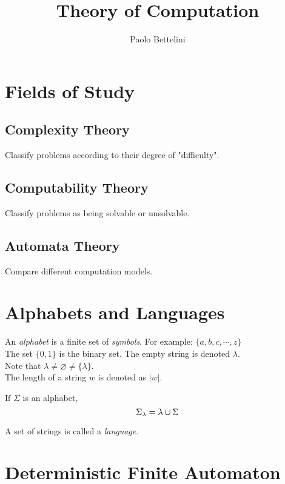 \documentclass{article}
\title{Theory of Computation}
\author{Paolo Bettelini}
\date{}
\newcommand{\emptyString}{\lambda}
\begin{document}
\maketitle
\tableofcontents
\pagebreak

\section{Fields of Study}

\subsection{Complexity Theory}

Classify problems according to their degree
of "difficulty".

\subsection{Computability Theory}

Classify problems as being solvable or unsolvable.

\subsection{Automata Theory}

Compare different computation models.

\section{Alphabets and Languages}

An \textit{alphabet} is a finite set of \textit{symbols}.
For example: \(\{a,b,c,\cdots, z\}\)\\
The set \(\{0,1\}\) is the binary set.
The empty string is denoted \(\emptyString\).
\\
Note that \(\emptyString \neq \varnothing \neq \{\emptyString\}\).
\\
The length of a string \(w\) is denoted as \(|w|\).

If \(\Sigma\) is an alphabet,
\[
    \Sigma_\emptyString = \emptyString \union \Sigma
\]

A set of strings is called a \textit{language}.

\section{Deterministic Finite Automaton}
\end{document}
